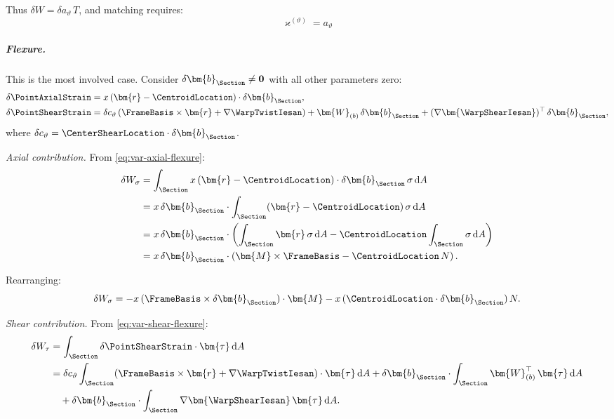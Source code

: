 Thus $\delta W = \delta a_\vartheta\,T$, and matching requires:
\begin{equation}
\varkappa^{(\vartheta)} = a_\vartheta
\label{eq:conj-twist-torsion}
\end{equation}

\subparagraph{Flexure.}

This is the most involved case. Consider $\delta\bm{b}_{\Section} \neq \mathbf{0}$ with 
all other parameters zero:
\begin{align}
\delta\PointAxialStrain &= x\,(\bm{r} - \CentroidLocation) \cdot \delta\bm{b}_{\Section}, 
\label{eq:var-axial-flexure} \\
\delta\PointShearStrain &= \delta c_\vartheta\,(\FrameBasis \times \bm{r} + \nabla\WarpTwistIesan) 
+ \bm{W}_{(b)}\,\delta\bm{b}_{\Section} + (\nabla\bm{\WarpShearIesan})^\top\,\delta\bm{b}_{\Section},
\label{eq:var-shear-flexure}
\end{align}
where $\delta c_\vartheta = \CenterShearLocation \cdot \delta\bm{b}_{\Section}$.

\emph{Axial contribution.} From \eqref{eq:var-axial-flexure}:
\begin{align*}
\delta W_\sigma &= \int_\Section x\,(\bm{r} - \CentroidLocation) \cdot \delta\bm{b}_{\Section}\,\sigma \, \mathrm{d}A \\
&= x\,\delta\bm{b}_{\Section} \cdot \int_\Section (\bm{r} - \CentroidLocation)\,\sigma \, \mathrm{d}A \\
&= x\,\delta\bm{b}_{\Section} \cdot \left( \int_\Section \bm{r}\,\sigma \, \mathrm{d}A 
- \CentroidLocation \int_\Section \sigma \, \mathrm{d}A \right) \\
&= x\,\delta\bm{b}_{\Section} \cdot \left( \bm{M} \times \FrameBasis - \CentroidLocation\,N \right).
\end{align*}

Rearranging:
\begin{equation}
\delta W_\sigma = -x\,(\FrameBasis \times \delta\bm{b}_{\Section}) \cdot \bm{M} 
- x\,(\CentroidLocation \cdot \delta\bm{b}_{\Section})\,N.
\label{eq:axial-work-flexure}
\end{equation}

\emph{Shear contribution.} From \eqref{eq:var-shear-flexure}:
\begin{align}
\delta W_\tau &= \int_\Section \delta\PointShearStrain \cdot \bm{\tau} \, \mathrm{d}A \notag \\
&= \delta c_\vartheta \int_\Section (\FrameBasis \times \bm{r} + \nabla\WarpTwistIesan) \cdot \bm{\tau} \, \mathrm{d}A 
+ \delta\bm{b}_{\Section} \cdot \int_\Section \bm{W}_{(b)}^\top\,\bm{\tau} \, \mathrm{d}A \notag \\
&\quad + \delta\bm{b}_{\Section} \cdot \int_\Section \nabla\bm{\WarpShearIesan}\,\bm{\tau} \, \mathrm{d}A.
\label{eq:shear-work-flexure-1}
\end{align}

